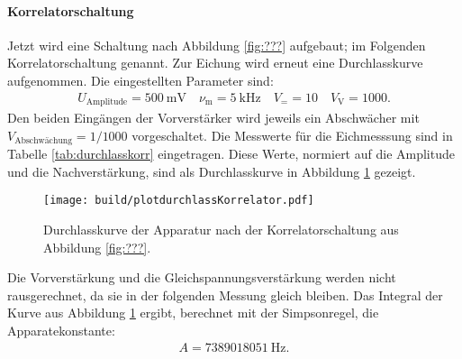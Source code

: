 \paragraph{Korrelatorschaltung}

Jetzt wird eine Schaltung nach Abbildung \ref{fig:???} aufgebaut; im Folgenden Korrelatorschaltung genannt. Zur Eichung wird erneut eine Durchlasskurve aufgenommen. Die eingestellten Parameter sind:
\begin{align*}
  U_\text{Amplitude} = \SI{500}{\milli\volt} \quad \nu_\text{m} = \SI{5}{\kilo\hertz}\quad V_= = 10 \quad V_\text{V} = 1000.
\end{align*}
Den beiden Eingängen der Vorverstärker wird jeweils ein Abschwächer mit $V_\text{Abschwächung} = 1/1000$ vorgeschaltet.
Die Messwerte für die Eichmesssung sind in Tabelle \ref{tab:durchlasskorr} eingetragen.
Diese Werte, normiert auf die Amplitude und die Nachverstärkung, sind als Durchlasskurve in Abbildung \ref{fig:plotdurchlasskorr} gezeigt.
\begin{figure}
  \centering
  \texttt{[image: build/plotdurchlassKorrelator.pdf]}
  \caption{Durchlasskurve der Apparatur nach der Korrelatorschaltung aus Abbildung \ref{fig:???}.}
  \label{fig:plotdurchlasskorr}
\end{figure}
Die Vorverstärkung und die Gleichspannungsverstärkung werden nicht rausgerechnet, da sie in der folgenden Messung gleich bleiben. Das Integral der Kurve aus Abbildung \ref{fig:plotdurchlasskorr} ergibt, berechnet mit der Simpsonregel, die Apparatekonstante:
\begin{align}
  A = \SI{7389018051}{\hertz}.
\end{align}

